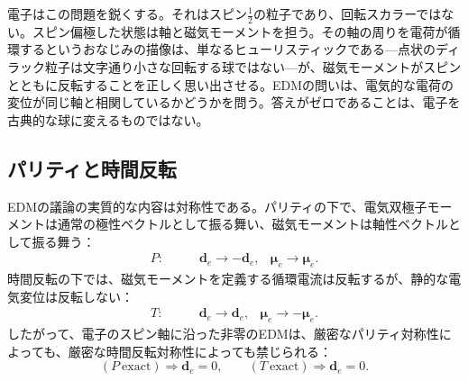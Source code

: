 電子はこの問題を鋭くする。それはスピン\(\tfrac12\)の粒子であり、回転スカラーではない。スピン偏極した状態は軸と磁気モーメントを担う。その軸の周りを電荷が循環するというおなじみの描像は、単なるヒューリスティックである---点状のディラック粒子は文字通り小さな回転する球ではない---が、磁気モーメントがスピンとともに反転することを正しく思い出させる。EDMの問いは、電気的な電荷の変位が同じ軸と相関しているかどうかを問う。答えがゼロであることは、電子を古典的な球に変えるものではない。

\begin{classroomqa}
\end{classroomqa}

\begin{classroomqa}
\end{classroomqa}

\subsection{パリティと時間反転}

EDMの議論の実質的な内容は対称性である。パリティの下で、電気双極子モーメントは通常の極性ベクトルとして振る舞い、磁気モーメントは軸性ベクトルとして振る舞う：
\begin{align}
P:\qquad &\mathbf d_e \to -\mathbf d_e,
&\boldsymbol{\mu}_e \to \boldsymbol{\mu}_e .
\end{align}
時間反転の下では、磁気モーメントを定義する循環電流は反転するが、静的な電気変位は反転しない：
\begin{align}
T:\qquad &\mathbf d_e \to \mathbf d_e,
&\boldsymbol{\mu}_e \to -\boldsymbol{\mu}_e .
\end{align}
したがって、電子のスピン軸に沿った非零のEDMは、厳密なパリティ対称性によっても、厳密な時間反転対称性によっても禁じられる：
\begin{equation}
(P\ \text{exact}) \Rightarrow \mathbf d_e=0,
\qquad
(T\ \text{exact}) \Rightarrow \mathbf d_e=0.
\end{equation}

